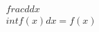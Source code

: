 \documentclass[preview]{standalone}
\begin{document}
\begin{align*}
\quad\\frac{d}{dx} \quad\\int f(x) dx = f(x)
\end{align*}
\end{document}
